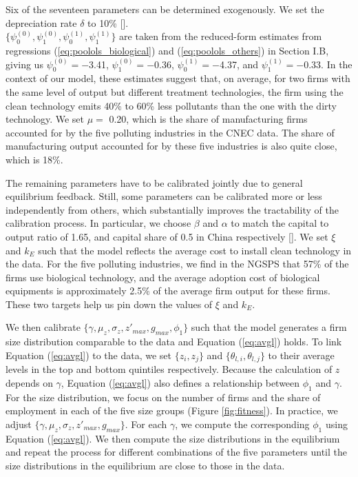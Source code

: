 \documentclass[AEJ]{AEA}
\begin{document}
Six of the seventeen parameters can be determined exogenously. We set the depreciation rate $\delta$ to 10\% [\citet{Songetal:2011}]. \\ $\{\psi_0^{(0)}, \psi_1^{(0)}, \psi_0^{(1)}, \psi_1^{(1)} \}$ are taken from the reduced-form estimates from regressions (\ref{eq:poolols_biological}) and (\ref{eq:poolols_others}) in Section I.B, giving us $\psi_0^{(0)} = -$3.41, $\psi_1^{(0)} = -$0.36, $\psi_0^{(1)} = -$4.37, and  $\psi_1^{(1)} = -$0.33. In the context of our model, these estimates suggest that, on average, for two firms with the same level of output but different treatment technologies, the firm using the clean technology emits 40\% to 60\% less pollutants than the one with the dirty technology. We set $\mu =$ 0.20, which is the share of manufacturing firms accounted for by the five polluting industries in the CNEC data. The share of manufacturing output accounted for by these five industries is also quite close, which is 18\%.%

The remaining parameters have to be calibrated jointly due to general equilibrium feedback. Still, some parameters can be calibrated more or less independently from others, which substantially improves the tractability of the calibration process. In particular, we choose $\beta$ and $\alpha$ to match the capital to output ratio of 1.65, and capital share of 0.5 in China respectively [\citet{Baietal:2006}]. We set $\xi$ and $k_E$ such that the model reflects the average cost to install clean technology in the data. For the five polluting industries, we find in the NGSPS that 57\% of the firms use biological technology, and the average adoption cost of biological equipments is approximately 2.5\% of the average firm output for these firms. These two targets help us pin down the values of $\xi$ and $k_E$.

We then calibrate $\{\gamma, \mu_z, \sigma_z, z'_{max}, g_{max}, \phi_1 \}$ such that the model generates a firm size distribution comparable to the data and Equation (\ref{eq:avgl}) holds. To link Equation (\ref{eq:avgl}) to the data, we set $\{z_i, z_j\}$ and $\{\theta_{l,i}, \theta_{l,j}\}$ to their average levels in the top and bottom quintiles respectively. Because the calculation of $z$ depends on $\gamma$, Equation (\ref{eq:avgl}) also defines a relationship between $\phi_1$ and $\gamma$. For the size distribution, we focus on the number of firms and the share of employment in each of the five size groups (Figure \ref{fig:fitness}). In practice, we adjust $\{\gamma, \mu_z, \sigma_z, z'_{max}, g_{max} \}$. For each $\gamma$, we compute the corresponding $\phi_1$ using Equation (\ref{eq:avgl}). We then compute the size distributions in the equilibrium and repeat the process for different combinations of the five parameters until the size distributions in the equilibrium are close to those in the data.
\end{document}
